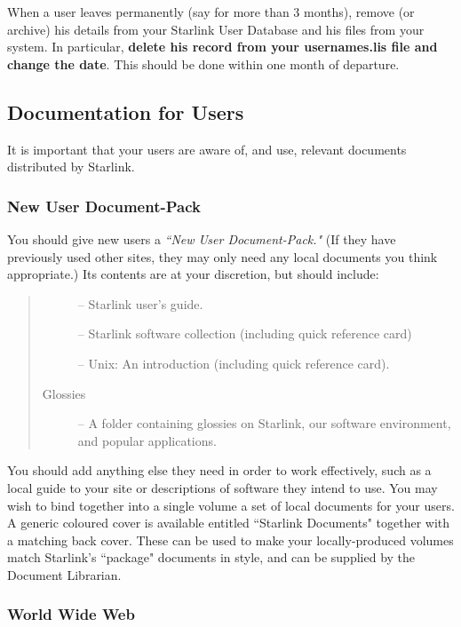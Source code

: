 When a user leaves permanently (say for more than 3 months), remove (or archive)
his details from your Starlink User Database and his files from your system.
In particular, {\bf delete his record from your usernames.lis file and change
the date}.
This should be done within one month of departure.

\subsection{Documentation for Users}

It is important that your users are aware of, and use, relevant documents
distributed by Starlink.

\subsubsection{\label{NUDP}New User Document-Pack}

You should give new users a {\em ``New User Document-Pack."}
(If they have previously used other sites, they may only need any local
documents you think appropriate.)
Its contents are at your discretion, but should include:

\begin{quote}
\begin{description}
\item [] -- Starlink user's guide.
\item [] -- Starlink software collection (including
quick reference card)
\item [] -- Unix: An introduction (including quick
reference card).
\item [Glossies] -- A folder containing glossies on Starlink, our software
 environment, and popular applications.
\end{description}
\end{quote}

You should add anything else they need in order to work effectively, such
as a local guide to your site or descriptions of software they intend to use.
You may wish to bind together into a single volume a set of local documents
for your users.
A generic coloured cover is available entitled ``Starlink Documents" together
with a matching back cover.
These can be used to make your locally-produced volumes match Starlink's
``package" documents in style, and can be supplied by the Document Librarian.
 
\subsubsection{World Wide Web}

